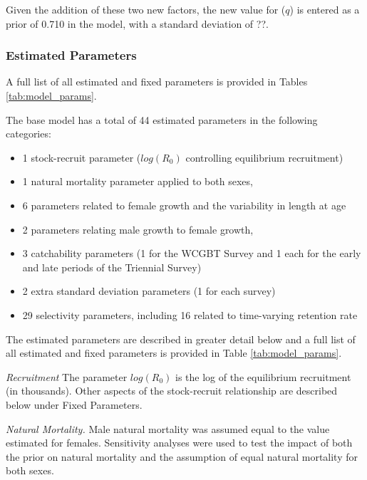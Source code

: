 \documentclass[12pt,]{article}
\begin{document}
Given the addition of these two new factors, the new value for (\(q\))
is entered as a prior of 0.710 in the model, with a standard deviation
of ??.

\hypertarget{estimated-parameters}{%
\subsubsection{Estimated Parameters}\label{estimated-parameters}}

A full list of all estimated and fixed parameters is provided in Tables
\ref{tab:model_params}.

The base model has a total of 44 estimated parameters in the following
categories:

\begin{itemize}
  \item 1 stock-recruit parameter ($log(R_0)$ controlling equilibrium recruitment)
  \item 1 natural mortality parameter applied to both sexes,
  \item 6 parameters related to female growth and the variability in length at age
  \item 2 parameters relating male growth to female growth,
  \item 3 catchability parameters (1 for the WCGBT Survey and 1 each for the early and late periods of the Triennial Survey)
  \item 2 extra standard deviation parameters (1 for each survey)
  \item 29 selectivity parameters, including 16 related to time-varying retention rate
\end{itemize}

The estimated parameters are described in greater detail below and a
full list of all estimated and fixed parameters is provided in Table
\ref{tab:model_params}.

\emph{Recruitment} The parameter \(log(R_0)\) is the log of the
equilibrium recruitment (in thousands). Other aspects of the
stock-recruit relationship are described below under Fixed Parameters.

\emph{Natural Mortality.} Male natural mortality was assumed equal to
the value estimated for females. Sensitivity analyses were used to test
the impact of both the prior on natural mortality and the assumption of
equal natural mortality for both sexes.
\end{document}
